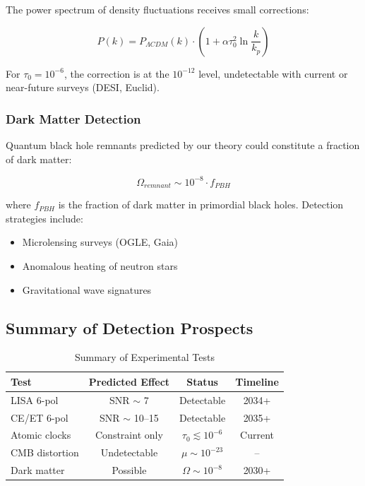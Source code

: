 The power spectrum of density fluctuations receives small corrections:

\begin{equation}
    P(k) = P_{\Lambda CDM}(k) \cdot \left(1 + \alpha \tau_0^2 \ln\frac{k}{k_p}\right)
\end{equation}

For $\tau_0 = 10^{-6}$, the correction is at the $10^{-12}$ level, undetectable with current or near-future surveys (DESI, Euclid).

\subsubsection{Dark Matter Detection}

Quantum black hole remnants predicted by our theory could constitute a fraction of dark matter:

\begin{equation}
    \Omega_{remnant} \sim 10^{-8} \cdot f_{PBH}
\end{equation}

where $f_{PBH}$ is the fraction of dark matter in primordial black holes. Detection strategies include:

\begin{itemize}
    \item Microlensing surveys (OGLE, Gaia)
    \item Anomalous heating of neutron stars
    \item Gravitational wave signatures
\end{itemize}

\subsection{Summary of Detection Prospects}

\begin{table}[htbp]
\centering
\caption{Summary of Experimental Tests}
\label{tab:detection_summary}
\begin{tabular}{lccc}
\toprule
\textbf{Test} & \textbf{Predicted Effect} & \textbf{Status} & \textbf{Timeline} \\
\midrule
LISA 6-pol & SNR $\sim$ 7 & Detectable & 2034+ \\
CE/ET 6-pol & SNR $\sim$ 10--15 & Detectable & 2035+ \\
Atomic clocks & Constraint only & $\tau_0 \lesssim 10^{-6}$ & Current \\
CMB distortion & Undetectable & $\mu \sim 10^{-23}$ & -- \\
Dark matter & Possible & $\Omega \sim 10^{-8}$ & 2030+ \\
\bottomrule
\end{tabular}
\end{table}

